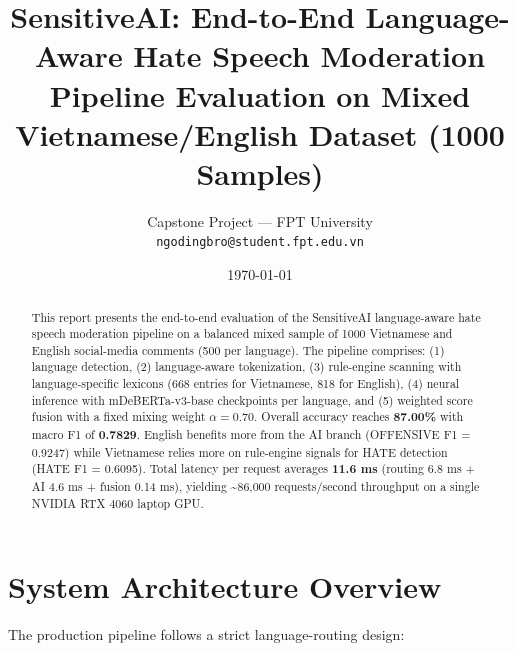\documentclass[11pt,a4paper]{article}
\title{
    \vspace{-1cm}
    \textbf{SensitiveAI: End-to-End Language-Aware Hate Speech Moderation}\\
    \large Pipeline Evaluation on Mixed Vietnamese/English Dataset (1000 Samples)
}
\author{
    Capstone Project --- FPT University\\
    \texttt{ngodingbro@student.fpt.edu.vn}
}
\date{\today}
\begin{document}
\maketitle

\begin{abstract}
This report presents the end-to-end evaluation of the SensitiveAI language-aware hate speech moderation pipeline on a balanced mixed sample of 1000 Vietnamese and English social-media comments (500 per language). The pipeline comprises: (1) language detection, (2) language-aware tokenization, (3) rule-engine scanning with language-specific lexicons (668 entries for Vietnamese, 818 for English), (4) neural inference with mDeBERTa-v3-base checkpoints per language, and (5) weighted score fusion with a fixed mixing weight $\alpha = 0.70$. Overall accuracy reaches \textbf{87.00\%} with macro F1 of \textbf{0.7829}. English benefits more from the AI branch (OFFENSIVE F1 = 0.9247) while Vietnamese relies more on rule-engine signals for HATE detection (HATE F1 = 0.6095). Total latency per request averages \textbf{11.6 ms} (routing 6.8 ms + AI 4.6 ms + fusion 0.14 ms), yielding \textasciitilde 86,000 requests/second throughput on a single NVIDIA RTX 4060 laptop GPU.
\end{abstract}

\section{System Architecture Overview}
\label{sec:architecture}

The production pipeline follows a strict language-routing design:
\end{document}
